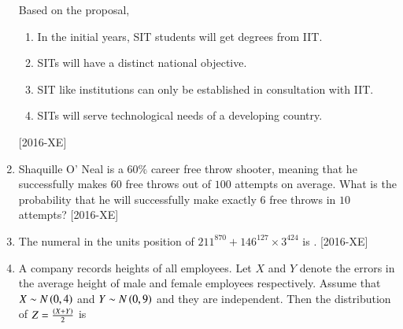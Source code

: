 \documentclass[journal]{IEEEtran}
\begin{document}
\begin{enumerate}
Based on the proposal, 
\begin{enumerate}[label=(\roman*), leftmargin=3em, labelsep=0.5em, itemindent=1.5em]
    \item In the initial years, SIT students will get degrees from IIT.
    \item SITs will have a distinct national objective.
    \item SIT like institutions can only be established in consultation with IIT.
    \item SITs will serve technological needs of a developing country.
\end{enumerate}
\hfill{[2016-XE]}
\begin{enumerate}
\end{enumerate}
\item Shaquille O' Neal is a $60\%$ career free throw shooter, meaning that he successfully makes 60 free throws out of $100$ attempts on average. What is the probability that he will successfully make exactly $6$ free throws in $10$ attempts? \hfill{[2016-XE]}\\
\begin{enumerate}
\end{enumerate}
\item The numeral in the units position of $211^{870}+146^{127}\times3^{424}$ is \underline{\hspace{1cm}}. \hfill{[2016-XE]}\\
\item A company records heights of all employees. Let $X$ and $Y$ denote the errors in the average height of male and female employees respectively. Assume that $X\sim N\left(0,4\right)$ and $Y\sim N\left(0,9\right)$ and they are independent. Then the distribution of $Z=\frac{\left(X+Y\right)}{2}$ is 


\end{enumerate}
\end{document}
